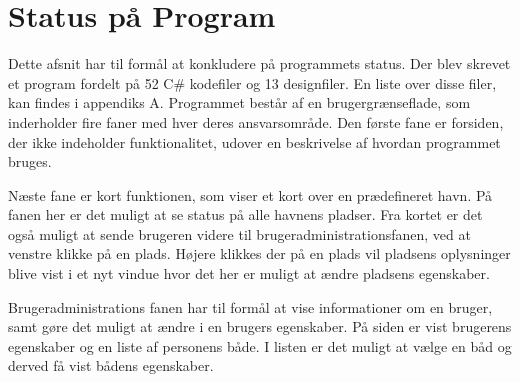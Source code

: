\section{Status på Program} 
\label{sec:status_p_program}

Dette afsnit har til formål at konkludere på programmets status. Der blev skrevet et program fordelt på 52 C\# kodefiler og 13 designfiler. En liste over disse filer, kan findes i appendiks A. Programmet består af en brugergrænseflade, som inderholder fire faner med hver deres ansvarsområde. Den første fane er forsiden, der ikke indeholder funktionalitet, udover en beskrivelse af hvordan programmet bruges.

Næste fane er kort funktionen, som viser et kort over en prædefineret havn. På fanen her er det muligt at se status på alle havnens pladser. Fra kortet er det også muligt at sende brugeren videre til brugeradministrationsfanen, ved at venstre klikke på en plads. Højere klikkes der på en plads vil pladsens oplysninger blive vist i et nyt vindue hvor det her er muligt at ændre pladsens egenskaber.

Brugeradministrations fanen har til formål at vise informationer om en bruger, samt gøre det muligt at ændre i en brugers egenskaber. På siden er vist brugerens egenskaber og en liste af personens både. I listen er det muligt at vælge en båd og derved få vist bådens egenskaber.